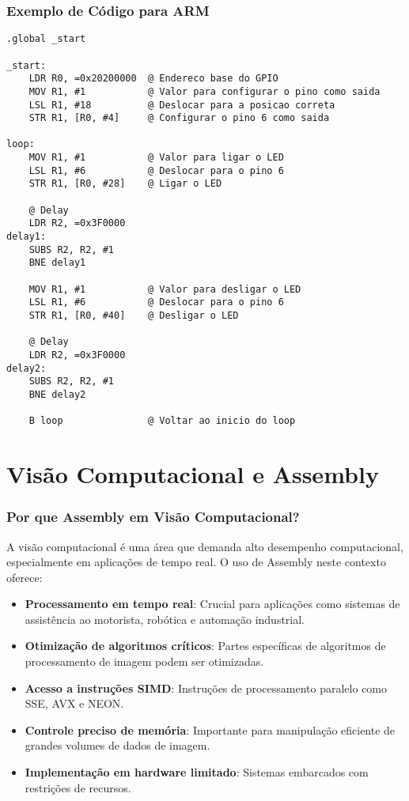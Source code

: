 \documentclass[11pt]{beamer}
\begin{document}
\begin{frame}[fragile]
\frametitle{Exemplo de Código para ARM}

\begin{lstlisting}[language={[x86masm]Assembler}, basicstyle=\tiny]
.global _start

_start:
    LDR R0, =0x20200000  @ Endereco base do GPIO
    MOV R1, #1           @ Valor para configurar o pino como saida
    LSL R1, #18          @ Deslocar para a posicao correta
    STR R1, [R0, #4]     @ Configurar o pino 6 como saida

loop:
    MOV R1, #1           @ Valor para ligar o LED
    LSL R1, #6           @ Deslocar para o pino 6
    STR R1, [R0, #28]    @ Ligar o LED

    @ Delay
    LDR R2, =0x3F0000
delay1:
    SUBS R2, R2, #1
    BNE delay1

    MOV R1, #1           @ Valor para desligar o LED
    LSL R1, #6           @ Deslocar para o pino 6
    STR R1, [R0, #40]    @ Desligar o LED

    @ Delay
    LDR R2, =0x3F0000
delay2:
    SUBS R2, R2, #1
    BNE delay2

    B loop               @ Voltar ao inicio do loop
\end{lstlisting}

\end{frame}

\section{Visão Computacional e Assembly}

\begin{frame}
\frametitle{Por que Assembly em Visão Computacional?}

A visão computacional é uma área que demanda alto desempenho computacional, especialmente em aplicações de tempo real. O uso de Assembly neste contexto oferece:

\begin{itemize}
    \item \textbf{Processamento em tempo real}: Crucial para aplicações como sistemas de assistência ao motorista, robótica e automação industrial.
    \item \textbf{Otimização de algoritmos críticos}: Partes específicas de algoritmos de processamento de imagem podem ser otimizadas.
    \item \textbf{Acesso a instruções SIMD}: Instruções de processamento paralelo como SSE, AVX e NEON.
    \item \textbf{Controle preciso de memória}: Importante para manipulação eficiente de grandes volumes de dados de imagem.
    \item \textbf{Implementação em hardware limitado}: Sistemas embarcados com restrições de recursos.
\end{itemize}

\end{frame}
\end{document}
